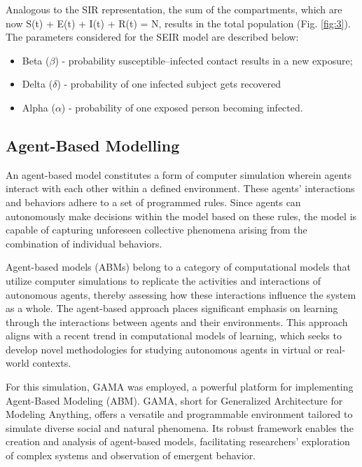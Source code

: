 Analogous to the SIR representation, the sum of the compartments, which are now S(t) + E(t) + I(t) + R(t) = N, results in the total population (Fig. \ref{fig:3}). The parameters considered for the SEIR model are described below: 

\begin{itemize}
	\item Beta ($\beta$) - probability susceptible–infected contact results in a new exposure;
	\item Delta ($\delta$) - probability of one infected subject gets recovered
	\item  Alpha ($\alpha$) -  probability of one exposed person becoming infected.
\end{itemize}

\subsection{Agent-Based Modelling}
\vspace{8pt} %

An agent-based model constitutes a form of computer simulation wherein agents interact with each other within a defined environment. These agents' interactions and behaviors adhere to a set of programmed rules. Since agents can autonomously make decisions within the model based on these rules, the model is capable of capturing unforeseen collective phenomena arising from the combination of individual behaviors. 

Agent-based models (ABMs) belong to a category of computational models that utilize computer simulations to replicate the activities and interactions of autonomous agents, thereby assessing how these interactions influence the system as a whole. The agent-based approach places significant emphasis on learning through the interactions between agents and their environments. This approach aligns with a recent trend in computational models of learning, which seeks to develop novel methodologies for studying autonomous agents in virtual or real-world contexts.

For this simulation, GAMA was employed, a powerful platform for implementing Agent-Based Modeling (ABM). GAMA, short for Generalized Architecture for Modeling Anything, offers a versatile and programmable environment tailored to simulate diverse social and natural phenomena. Its robust framework enables the creation and analysis of agent-based models, facilitating researchers' exploration of complex systems and observation of emergent behavior.

